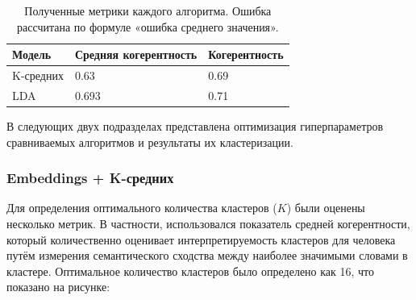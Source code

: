 \documentclass[14pt,a4paper]{article}
\begin{document}

\begin{table}[h]
\centering
\begin{tabular}{|l|l|l|}
\hline
\textbf{Модель} & \textbf{Средняя когерентность} & \multicolumn{1}{c|}{\textbf{Когерентность}} \\ \hline
K-средних        & 0.63                & 0.69                                    \\ \hline
LDA            & 0.693          & 0.71                                    \\ \hline
\end{tabular}
\caption{Полученные метрики каждого алгоритма. Ошибка рассчитана по формуле «ошибка среднего значения».
}
\label{tab:ClusteringPivotTable}
\end{table}






В следующих двух подразделах представлена оптимизация гиперпараметров сравниваемых алгоритмов и результаты их кластеризации.

\subsubsection{Embeddings + K-средних}

Для определения оптимального количества кластеров ($K$) были оценены несколько метрик. В частности, использовался показатель средней когерентности, который количественно оценивает интерпретируемость кластеров для человека путём измерения семантического сходства между наиболее значимыми словами в кластере. Оптимальное количество кластеров было определено как 16, что показано на рисунке:
\end{document}
